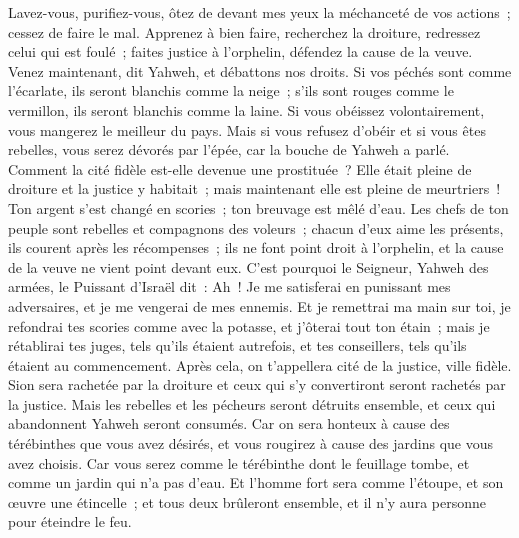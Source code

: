 \begin{multicols}{2}
Lavez-vous, purifiez-vous, ôtez de devant mes yeux la méchanceté de vos actions~; cessez de faire le mal.
Apprenez à bien faire, recherchez la droiture, redressez celui qui est foulé~; faites justice à l'orphelin, défendez la cause de la veuve.
Venez maintenant, dit Yahweh, et débattons nos droits. Si vos péchés sont comme l'écarlate, ils seront blanchis comme la neige~; s'ils sont rouges comme le vermillon, ils seront blanchis comme la laine.
Si vous obéissez volontairement, vous mangerez le meilleur du pays.
Mais si vous refusez d'obéir et si vous êtes rebelles, vous serez dévorés par l'épée, car la bouche de Yahweh a parlé.
Comment la cité fidèle est-elle devenue une prostituée~? Elle était pleine de droiture et la justice y habitait~; mais maintenant elle est pleine de meurtriers~!
Ton argent s'est changé en scories~; ton breuvage est mêlé d'eau.
Les chefs de ton peuple sont rebelles et compagnons des voleurs~; chacun d'eux aime les présents, ils courent après les récompenses~; ils ne font point droit à l'orphelin, et la cause de la veuve ne vient point devant eux.
C'est pourquoi le Seigneur, Yahweh des armées, le Puissant d'Israël dit~: Ah~! Je me satisferai en punissant mes adversaires, et je me vengerai de mes ennemis.
Et je remettrai ma main sur toi, je refondrai tes scories comme avec la potasse, et j'ôterai tout ton étain~;
mais je rétablirai tes juges, tels qu'ils étaient autrefois, et tes conseillers, tels qu'ils étaient au commencement. Après cela, on t'appellera cité de la justice, ville fidèle.
Sion sera rachetée par la droiture et ceux qui s'y convertiront seront rachetés par la justice.
Mais les rebelles et les pécheurs seront détruits ensemble, et ceux qui abandonnent Yahweh seront consumés.
Car on sera honteux à cause des térébinthes que vous avez désirés, et vous rougirez à cause des jardins que vous avez choisis.
Car vous serez comme le térébinthe dont le feuillage tombe, et comme un jardin qui n'a pas d'eau.
Et l'homme fort sera comme l'étoupe, et son œuvre une étincelle~; et tous deux brûleront ensemble, et il n'y aura personne pour éteindre le feu.

\end{multicols}
